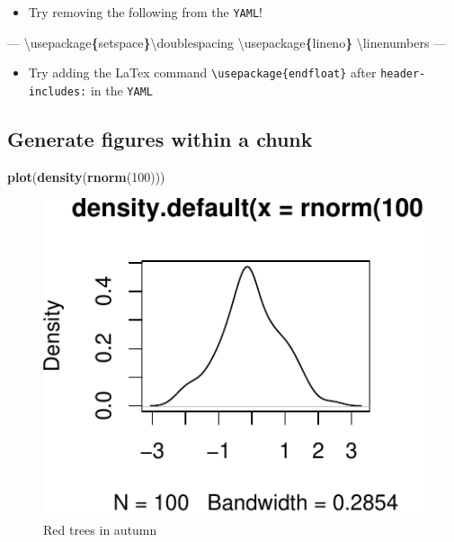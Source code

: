 \documentclass[12pt,]{article}
\newenvironment{Shaded}{\begin{snugshade}}{\end{snugshade}}
\newcommand{\KeywordTok}[1]{\textcolor[rgb]{0.13,0.29,0.53}{\textbf{#1}}}
\newcommand{\DecValTok}[1]{\textcolor[rgb]{0.00,0.00,0.81}{#1}}
\newcommand{\OtherTok}[1]{\textcolor[rgb]{0.56,0.35,0.01}{#1}}
\newcommand{\NormalTok}[1]{#1}
\providecommand{\tightlist}{%
  \setlength{\itemsep}{0pt}\setlength{\parskip}{0pt}}
\begin{document}
\begin{itemize}
\tightlist
\item
  Try removing the following from the \texttt{YAML}!
\end{itemize}

\begin{Shaded}
\begin{Highlighting}[]
\OtherTok{---}
\NormalTok{\textbackslash{}usepackage}\KeywordTok{\{}\NormalTok{setspace}\KeywordTok{\}}\NormalTok{\textbackslash{}doublespacing}
\NormalTok{\textbackslash{}usepackage}\KeywordTok{\{}\NormalTok{lineno}\KeywordTok{\}}
\NormalTok{\textbackslash{}linenumbers}
\OtherTok{---}
\end{Highlighting}
\end{Shaded}

\begin{itemize}
\tightlist
\item
  Try adding the LaTex command
  \texttt{\textbackslash{}usepackage\{endfloat\}} after
  \texttt{header-includes:} in the \texttt{YAML}
\end{itemize}

\subsection{Generate figures within a
chunk}\label{generate-figures-within-a-chunk}

\begin{Shaded}
\begin{Highlighting}[]
\KeywordTok{plot}\NormalTok{(}\KeywordTok{density}\NormalTok{(}\KeywordTok{rnorm}\NormalTok{(}\DecValTok{100}\NormalTok{)))}
\end{Highlighting}
\end{Shaded}

\begin{figure}
\centering
\includegraphics{img/bell-curve-1.pdf}
\caption{\label{fig:bell-curve}Red trees in autumn}
\end{figure}
\end{document}
